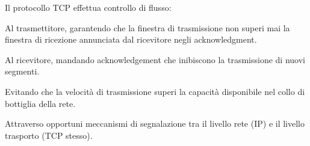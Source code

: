 \question[1]
Il protocollo TCP effettua controllo di flusso:

\begin{checkboxes}
	\CorrectChoice Al trasmettitore, garantendo che la finestra di trasmissione non superi mai la finestra di ricezione annunciata dal ricevitore negli acknowledgment.

	\choice Al ricevitore, mandando acknowledgement che inibiscono la trasmissione di nuovi segmenti.

	\choice Evitando che la velocità di trasmissione superi la capacità disponibile nel collo di bottiglia della rete.

	\choice Attraverso opportuni meccanismi di segnalazione tra il livello rete (IP) e il livello trasporto (TCP stesso).
\end{checkboxes}
